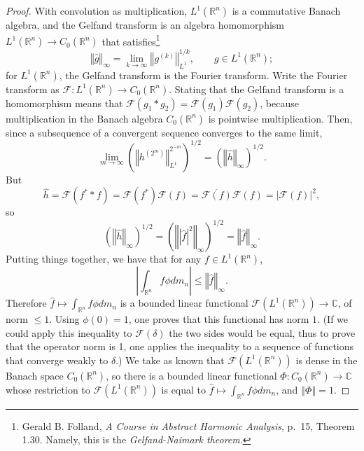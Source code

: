 \documentclass{article}
\newcommand{\norm}[1]{\left\Vert #1 \right\Vert}
\theoremstyle{definition}
\theoremstyle{definition}
\begin{document}
\begin{proof}
With convolution as multiplication, $L^1(\mathbb{R}^n)$ is a commutative Banach algebra, and the Gelfand
transform is an algebra homomorphism $L^1(\mathbb{R}^n) \to C_0(\mathbb{R}^n)$ that satisfies\footnote{Gerald B. Folland,
{\em A Course in Abstract Harmonic Analysis}, p.~15, Theorem 1.30. Namely, this is the {\em Gelfand-Naimark theorem}.}
\[
\norm{\hat{g}}_\infty = \lim_{k \to \infty} \norm{g^{(k)}}_{L^1}^{1/k}, \qquad g \in L^1(\mathbb{R}^n);
\]
for $L^1(\mathbb{R}^n)$, the Gelfand transform is the Fourier transform. Write the Fourier transform as 
$\mathscr{F}:L^1(\mathbb{R}^n) \to C_0(\mathbb{R}^n)$. Stating that the Gelfand transform is a homomorphism
means that $\mathscr{F}(g_1*g_2)=\mathscr{F}(g_1) \mathscr{F}(g_2)$, because multiplication in the Banach algebra $C_0(\mathbb{R}^n)$
is pointwise multiplication.
Then, since a subsequence of a convergent sequence converges to the same limit,
\[
\lim_{m \to \infty} \left(\norm{h^{\left(2^m\right)}}_{L^1}^{2^{-m}}\right)^{1/2} = \left( \norm{\hat{h}}_\infty \right)^{1/2}.
\]
But
\[
\hat{h}=\mathscr{F}(f^* * f) = \mathscr{F}(f^*) \mathscr{F}(f) = \overline{\mathscr{F}(f)} \mathscr{F}(f)= \left| \mathscr{F}(f) \right|^2,
\]
so
\[
\left( \norm{\hat{h}}_\infty \right)^{1/2} = \left( \norm{|\hat{f}|^2}_\infty \right)^{1/2} = \norm{\hat{f}}_\infty.
\]
Putting things together, we have that for any $f \in L^1(\mathbb{R}^n)$,
\[
\left| \int_{\mathbb{R}^n} f \phi dm_n \right| \leq \norm{\hat{f}}_\infty.
\]
Therefore $\hat{f} \mapsto \int_{\mathbb{R}^n} f \phi dm_n$ is a bounded linear functional $\mathscr{F}(L^1(\mathbb{R}^n)) \to \mathbb{C}$, of norm
$\leq 1$. Using $\phi(0)=1$, one proves that this functional has norm $1$. (If we could apply this inequality to $\mathscr{F}(\delta)$ the two sides would be equal, thus
 to prove that the operator norm is 1, one applies the inequality to a sequence of functions that converge weakly to $\delta$.)
We take as known that $\mathscr{F}(L^1(\mathbb{R}^n))$ is dense in the Banach space $C_0(\mathbb{R}^n)$, so there is a 
bounded linear functional $\Phi:C_0(\mathbb{R}^n) \to \mathbb{C}$ whose restriction to
$\mathscr{F}(L^1(\mathbb{R}^n))$ is equal to $\hat{f} \mapsto \int_{\mathbb{R}^n} f \phi dm_n$, and  $\norm{\Phi}=1$.


\end{proof}
\end{document}
